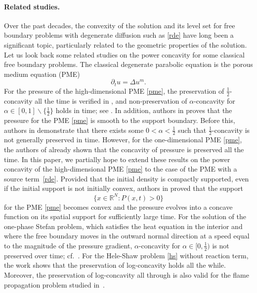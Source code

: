 \documentclass[10pt]{article}         %
\numberwithin{equation}{section}
\begin{document}
\paragraph{Related studies.} Over the past decades, the convexity of the solution and its level set for free boundary problems with degenerate diffusion such as \eqref{rde} have long been a significant topic, particularly related to the geometric properties of the solution. 
Let us look back some related studies on the power concavity for some classical free boundary problems. The classical degenerate parabolic equation is the porous medium equation (PME)
\begin{equation}\label{pme}\partial_t u=\Delta u^m.\end{equation}
For the pressure of the high-dimensional PME \eqref{pme}, the preservation of $\frac{1}{2}$-concavity all the time is verified in \cite{DHL2001}, and non-preservation of $\alpha$-concavity for $\alpha\in[0,1]\backslash\{\frac{1}{2}\} $  holds in time; see \cite{CW2024,ST2024}. In addition, authors in \cite{DHL2001,DH1998} proves that the pressure for the PME \eqref{pme} is smooth to the support boundary. Before this, authors in \cite{IS2010} demonstrate that there exists some $0<\alpha<\frac{1}{2}$ such that $\frac{1}{2}$-concavity is not generally preserved in time.  However, for the one-dimensional PME \eqref{pme}, the authors of  \cite{BV1987} already shown that the concavity of pressure is preserved all the time. In this paper, we partially hope to extend these results on the power concavity of the high-dimensional PME \eqref{pme} to the case of the PME with a source term~\eqref{rde}. Provided that the initial density is compactly supported, even if the initial support is not initially convex, authors in \cite{LV2003} proved that the support 
\[\{x\in\mathbb{R}^N: P(x,t)>0\}\] 
for the PME \eqref{pme} becomes convex and the pressure 
evolves into a concave function on its spatial support for sufficiently large time.  For the solution of the one-phase Stefan problem, which satisfies the heat equation in the interior and where the free boundary moves in the outward normal direction at a speed equal to the magnitude of the pressure gradient, $\alpha$-concavity for $\alpha\in[0,\frac{1}{2})$ is not preserved over time; cf.~\cite{CW2021}. For the Hele-Shaw problem \eqref{hs} without reaction term, the work \cite{DL2004} shows that the preservation of log-concavity holds all the while. Moreover, the preservation of log-concavity all through is also valid for the flame propagation problem studied in~\cite{DL2002}.
\end{document}
